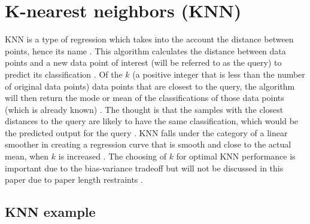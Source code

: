 \documentclass[12pt,openany]{book}
\begin{document}
\section{K-nearest neighbors (KNN)}\label{k-nearest-neighbors-knn}

KNN is a type of regression which takes into the account the distance
between points, hence its name \citep{shalizi}. This algorithm
calculates the distance between data points and a new data point of
interest (will be referred to as the query) to predict its
classification \citep{knn}. Of the \(k\) (a positive integer that is
less than the number of original data points) data points that are
closest to the query, the algorithm will then return the mode or mean of
the classifications of those data points (which is already known)
\citep{knn}. The thought is that the samples with the closest distances
to the query are likely to have the same classification, which would be
the predicted output for the query \citep{knn}. KNN falls under the
category of a linear smoother in creating a regression curve that is
smooth and close to the actual mean, when \(k\) is increased
\citep{shalizi}. The choosing of \(k\) for optimal KNN performance is
important due to the bias-variance tradeoff but will not be discussed in
this paper due to paper length restraints \citep{shalizi}.

\subsection{KNN example}\label{knn-example}
\end{document}

